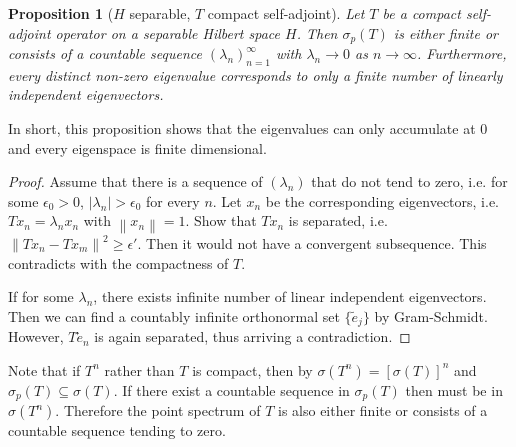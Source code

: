 \documentclass[12pt,a4paper]{report}
\numberwithin{equation}{section}
\theoremstyle{mystyle}
\newtheorem{proposition}[definition]{Proposition}
\newcommand{\norm}[1]{\left\lVert #1 \right\rVert}
\begin{document}
	\begin{proposition}[$H$ separable, $T$ compact self-adjoint]\label{prop:lambda tend zero}
		Let $T$ be a compact self-adjoint operator on a separable Hilbert space $H$. Then $\sigma_p(T)$ is either finite or consists of a countable sequence $(\lambda_n)_{n=1}^\infty$ with $\lambda_n\to 0$ as $n\to\infty$. Furthermore, every distinct non-zero eigenvalue corresponds to only a finite number of linearly independent eigenvectors.
	\end{proposition}
	In short, this proposition shows that the eigenvalues can only accumulate at $0$ and every eigenspace is finite dimensional.
	\begin{proof}
		Assume that there is a sequence of $(\lambda_n)$ that do not tend to zero, i.e. for some $\epsilon_0>0$, $|\lambda_n|>\epsilon_0$ for every $n$. Let $x_n$ be the corresponding eigenvectors, i.e. $Tx_n =\lambda_n x_n$ with $\norm{x_n}=1$. Show that $Tx_n$ is separated, i.e. $\norm{Tx_n-Tx_m}^2\geq \epsilon'.$ Then it would not have a convergent subsequence. This contradicts with the compactness of $T$.
		
		If for some $\lambda_n$, there exists infinite number of linear independent eigenvectors. Then we can find a countably infinite orthonormal set $\{\tilde{e}_j\}$ by Gram-Schmidt. However, $T\tilde{e}_n$ is again separated, thus arriving a contradiction.
	\end{proof}
	
	Note that if $T^n$ rather than $T$ is compact, then by $\sigma(T^n)=[\sigma(T)]^n$ and $\sigma_p(T)\subseteq \sigma(T)$. If there exist a countable sequence in $\sigma_p(T)$ then must be in $\sigma(T^n)$. Therefore the point spectrum of $T$ is also either finite or consists of a countable sequence tending to zero.
	
	
	
\end{document}
